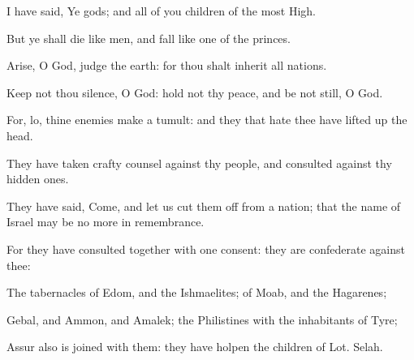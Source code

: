 {\Q {}I have
said, Ye
{}
gods; and all of you
{}
children of the most
High.


\par }{\Q {}But ye shall
die like
men, and
fall like
one of the
princes.


\par }{\Q {}Arise, O
God,
judge the
earth: for thou shalt
inherit all
nations.




\par }
{\Q {}Keep not thou
silence, O
God: hold not thy
peace, and be not
still, O
God.


\par }{\Q {}For, lo, thine
enemies make a
tumult: and they that
hate thee have lifted
up the
head.


\par }{\Q {}They have taken
crafty
counsel against thy
people, and
consulted against thy hidden
ones.


\par }{\Q {}They have
said,
Come, and let us cut them
off from
{} a
nation; that the
name of
Israel may be no more in
remembrance.


\par }{\Q {}For they have
consulted
together with one
consent: they
are
confederate against thee:


\par }{\Q {}The
tabernacles of
Edom, and the
Ishmaelites; of
Moab, and the
Hagarenes;


\par }{\Q {}Gebal, and
Ammon, and
Amalek; the
Philistines with the
inhabitants of
Tyre;


\par }{\Q {}Assur also is
joined with them: they have
holpen the
children of
Lot.
Selah.


\par }{\BB \par }
